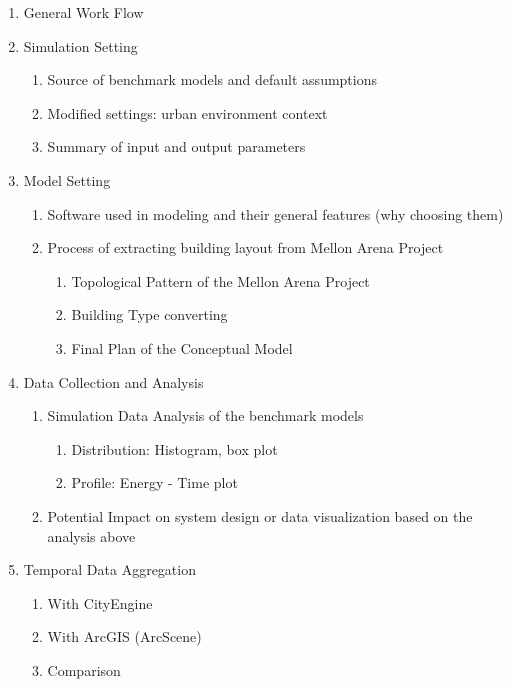 \documentclass[12pt]{article}
\begin{document}
\begin{enumerate}
\begin{enumerate}[label*=\arabic*.]
  \item General Work Flow
  \item Simulation Setting
    \begin{enumerate}[label*=\arabic*.]
    \item Source of benchmark models and default assumptions
    \item Modified settings: urban environment context
    \item Summary of input and output parameters
    \end{enumerate}
  \item Model Setting
    \begin{enumerate}[label*=\arabic*.]
    \item Software used in modeling and their general features (why
      choosing them)
    \item Process of extracting building layout from Mellon Arena
      Project
      \begin{enumerate}[label*=\arabic*.]
      \item Topological Pattern of the Mellon Arena Project
      \item Building Type converting
      \item Final Plan of the Conceptual Model
      \end{enumerate}
    \end{enumerate}
    \item Data Collection and Analysis
      \begin{enumerate}[label*=\arabic*.]
      \item Simulation Data Analysis of the benchmark models
        \begin{enumerate}[label*=\arabic*.]
        \item Distribution: Histogram, box plot
        \item Profile: Energy - Time plot
        \end{enumerate}
      \item Potential Impact on system design or data visualization
        based on the analysis above
      \end{enumerate}
    \item Temporal Data Aggregation
      \begin{enumerate}[label*=\arabic*.]
      \item With CityEngine
      \item With ArcGIS (ArcScene)
      \item Comparison
      \end{enumerate}

\end{enumerate}
\end{enumerate}
\end{document}
